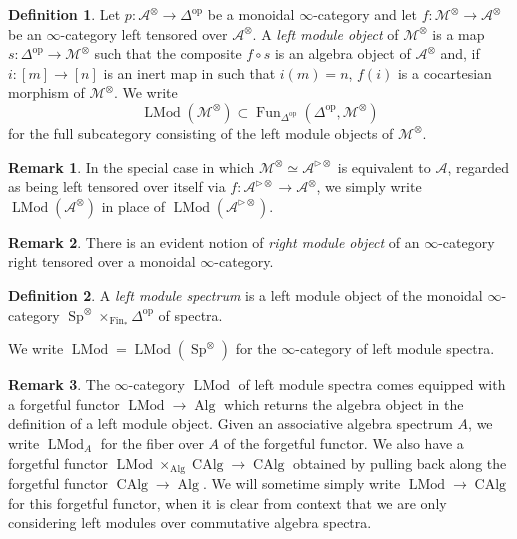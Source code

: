 \documentclass{article}
\theoremstyle{definition}
\newtheorem{definition}{Definition}[subsection]
\newtheorem{remark}{Remark}[subsection]
\newcommand{\A}{\mathcal{A}}
\newcommand{\M}{\mathcal{M}}
\renewcommand{\i}{\infty}
\newcommand{\op}{\mathrm{op}}
\DeclareMathOperator{\LMod}{LMod}
\DeclareMathOperator{\Alg}{Alg}
\DeclareMathOperator{\CAlg}{CAlg}
\DeclareMathOperator{\Fin}{Fin}
\DeclareMathOperator{\Fun}{Fun}
\DeclareMathOperator{\Sp}{Sp}
\begin{document}
\begin{definition}
Let $p:\A^\otimes\to\Delta^{\op}$ be a monoidal $\i$-category and let $f:\M^\otimes\to\A^\otimes$ be an $\i$-category left tensored over $\A^\otimes$. A {\em left module object} of $\M^\otimes$ is a map $s:\Delta^{\op}\to\M^\otimes$ such that the composite $f\circ s$ is an algebra object of $\A^\otimes$ and, if $i : [m]\to [n]$ is an inert map in such that $i(m) = n$, $f(i)$ is a cocartesian morphism of $\M^\otimes$.
We write
\[
\LMod(\M^\otimes)\subset\Fun_{\Delta^{\op}}(\Delta^{\op},\M^\otimes)
\]
for the full subcategory consisting of the left module objects of $\M^\otimes$.
\end{definition}
\begin{remark}
In the special case in which $\M^\otimes\simeq\A^{\triangleright\otimes}$ is equivalent to $\A$, regarded as being left tensored over itself via $f:\A^{\triangleright\otimes}\to\A^\otimes$, we simply write $\LMod(\A^\otimes)$ in place of $\LMod(\A^{\triangleright\otimes})$.
\end{remark}
\begin{remark}
There is an evident notion of {\em right module object} of an $\infty$-category right tensored over a monoidal $\i$-category.
\end{remark}

\begin{definition}
A {\em left module spectrum} is a left module object of the monoidal $\i$-category $\Sp^\otimes\times_{\Fin_*}\Delta^{\op}$ of spectra.
\end{definition}

We write $\LMod=\LMod(\Sp^\otimes)$ for the $\i$-category of left module spectra.

\begin{remark}
The $\i$-category $\LMod$ of left module spectra comes equipped with a forgetful functor $\LMod\to\Alg$ which returns the algebra object in the definition of a left module object.
Given an associative algebra spectrum $A$, we write $\LMod_A$ for the fiber over $A$ of the forgetful functor.
We also have a forgetful functor $\LMod\times_{\Alg}\CAlg\to\CAlg$ obtained by pulling back along the forgetful functor $\CAlg\to\Alg$.
We will sometime simply write $\LMod\to\CAlg$ for this forgetful functor, when it is clear from context that we are only considering left modules over commutative algebra spectra.
\end{remark}
\end{document}
